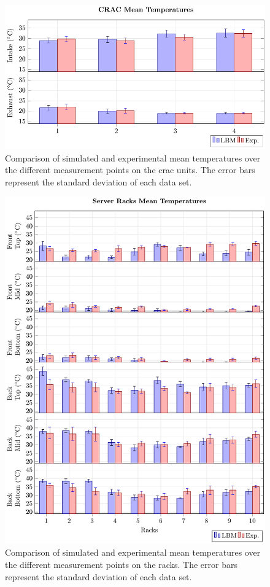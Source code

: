 \begin{figure}[!htb]
\centering
\includegraphics[width=\linewidth]{Plots/P02HDZX_T_mean.pdf}
\caption{Comparison of simulated and experimental mean temperatures over the different measurement points on the \gls{crac} units. The error bars represent the standard deviation of each data set.}
\label{fig:cracs_mean_temp_bars}
\end{figure}

\clearpage

\begin{figure}[!htb]
\centering
\includegraphics[width=\linewidth]{Plots/P02RX_T_mean.pdf}
\caption{Comparison of simulated and experimental mean temperatures over the different measurement points on the racks. The error bars represent the standard deviation of each data set.}
\label{fig:racks_mean_temp_bars}
\end{figure}

